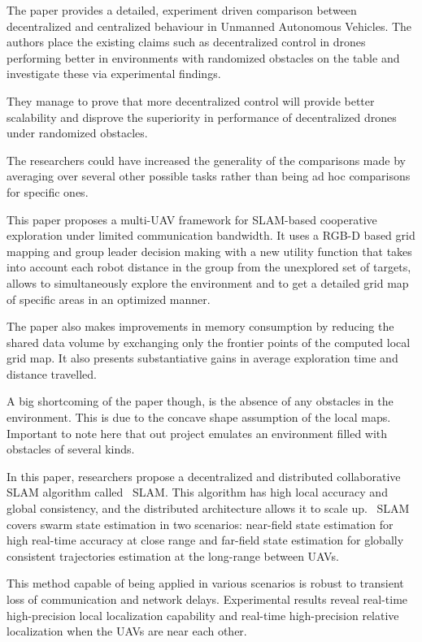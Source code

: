 \documentclass[conference]{IEEEtran}
\begin{document}
The paper provides a detailed, experiment driven comparison between decentralized and centralized behaviour in Unmanned Autonomous Vehicles. The authors place the existing claims such as decentralized control in drones performing better in environments with randomized obstacles on the table and investigate these via experimental findings.

They manage to prove that more decentralized control will provide better scalability and disprove the superiority in performance of decentralized drones under randomized obstacles.

The researchers could have increased the generality of the comparisons made by averaging over several other possible tasks rather than being ad hoc comparisons for specific ones\cite{mahdoui2019multiUAV}.




This paper proposes a multi-UAV framework for SLAM-based cooperative exploration under limited communication bandwidth. It uses a RGB-D based grid mapping and group leader decision making with a new utility function that takes into account each robot distance in the group from the unexplored set of targets, allows to simultaneously explore the environment and to get a detailed grid map of specific areas in an optimized manner.

The paper also makes improvements in memory consumption by reducing the shared data volume by exchanging only the frontier points of the computed local grid map. It also presents substantiative gains in average exploration time and distance travelled.

A big shortcoming of the paper though, is the absence of any obstacles in the environment. This is due to the concave shape assumption of the local maps. Important to note here that out project emulates an environment filled with obstacles of several kinds\cite{munguía2016vslam}.




In this paper, researchers propose a decentralized and distributed collaborative SLAM algorithm called  SLAM. This algorithm has high local accuracy and global consistency, and the distributed architecture allows it to scale up.  SLAM covers swarm state estimation in two scenarios: near-field state estimation for high real-time accuracy at close range and far-field state estimation for globally consistent trajectories estimation at the long-range between UAVs.

This method capable of being applied in various scenarios is robust to transient loss of communication and network delays. Experimental results reveal real-time high-precision local localization capability and real-time high-precision relative localization when the UAVs are near each other.
\end{document}
